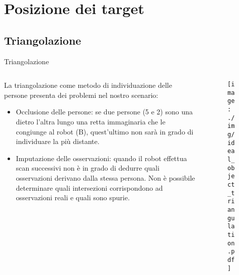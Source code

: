 \documentclass[10pt]{beamer}
\begin{document}
	\section{Posizione dei target}\label{sec:Posizione-dei-target}
	\frame{\sectionpage}
	
	\subsection{Triangolazione}\label{subsec:Triangolazione}
	\begin{frame}{Triangolazione}
		\begin{columns}
			\begin{column}{0.5\textwidth}
				La triangolazione come metodo di individuazione delle persone
				presenta dei problemi nel nostro scenario:
				\begin{itemize}
					\item Occlusione delle persone: se due persone
						(5 e 2) sono una dietro l'altra lungo una retta
						immaginaria che le congiunge al robot (B), quest'ultimo
						non sarà in grado di individuare la più distante. 

					\item Imputazione delle osservazioni: quando il robot
						effettua scan successivi non è in grado di dedurre
						quali osservazioni derivano dalla stessa persona.
						Non è possibile determinare quali intersezioni
						corrispondono ad osservazioni reali e quali sono spurie. 

				\end{itemize}
			\end{column}
			
			\begin{column}{0.5\textwidth}
				\begin{figure}[htpb]
					\centering
					\texttt{[image: ./img/ideal\_object\_triangulation.pdf]}
					\label{fig:triangulation}
				\end{figure}
			\end{column}
		\end{columns}
	\end{frame}
	
\end{document}
